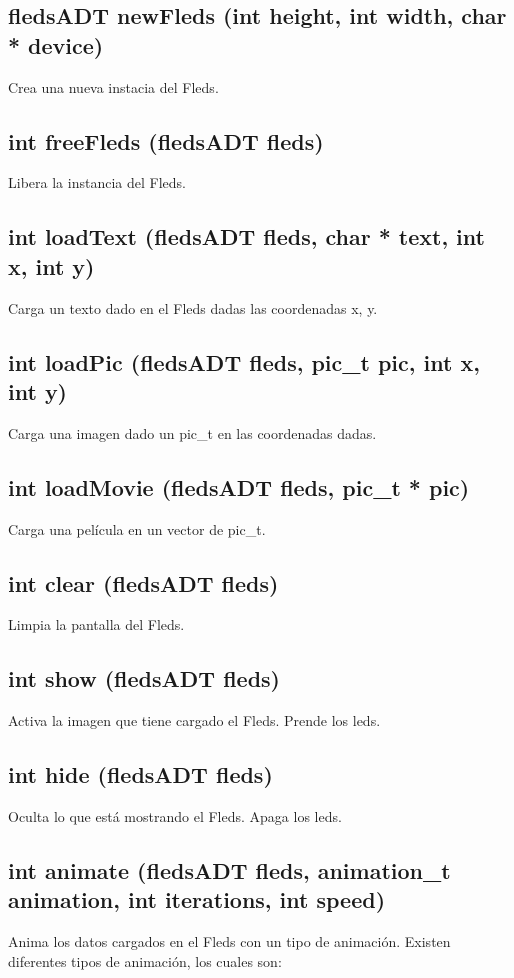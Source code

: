 \documentclass[a4paper,11pt,epsf]{article}
\begin{document}
\subsection{fledsADT newFleds (int height, int width, char * device)}
Crea una nueva instacia del Fleds.

\subsection{int freeFleds (fledsADT fleds)}
Libera la instancia del Fleds.

\subsection{int loadText (fledsADT fleds, char * text, int x, int y)}
Carga un texto dado en el Fleds dadas las coordenadas x, y.

\subsection{int loadPic (fledsADT fleds, pic\_t pic, int x, int y)}
Carga una imagen dado un pic\_t en las coordenadas dadas.

\subsection{int loadMovie (fledsADT fleds, pic\_t * pic)}
Carga una pel\'icula en un vector de pic\_t.

\subsection{int clear (fledsADT fleds)}
Limpia la pantalla del Fleds.

\subsection{int show (fledsADT fleds)}
Activa la imagen que tiene cargado el Fleds. Prende los leds.

\subsection{int hide (fledsADT fleds)}
Oculta lo que est\'a mostrando el Fleds. Apaga los leds.

\subsection{int animate (fledsADT fleds, animation\_t animation, int iterations, int speed)}
Anima los datos cargados en el Fleds con un tipo de animaci\'on. Existen diferentes tipos de animaci\'on, los cuales son:
\end{document}
